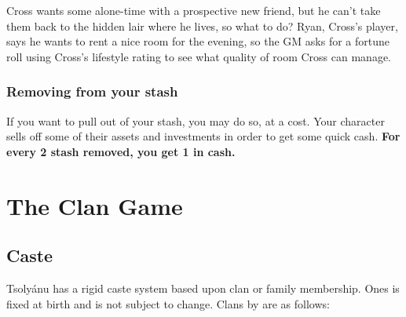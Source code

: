 \begin{qb}Cross wants some alone-time with a prospective new friend, but he can’t take them back to the hidden lair where he lives, so what to do? Ryan, Cross’s player, says he wants to rent a nice room for the evening, so the GM asks for a fortune roll using Cross’s lifestyle rating to see what quality of room Cross can manage.\end{qb}

\subsubsection{Removing  from your stash}

If you want to pull  out of your stash, you may do so, at a cost. Your character sells off some of their assets and investments in order to get some quick cash. \textbf{For every 2 stash removed, you get 1  in cash.}

\section{The Clan Game}

\subsection{Caste}

Tsoly\'anu has a rigid caste system based upon clan or family membership. Ones  is fixed at birth and is not subject to change. Clans by  are as follows:

